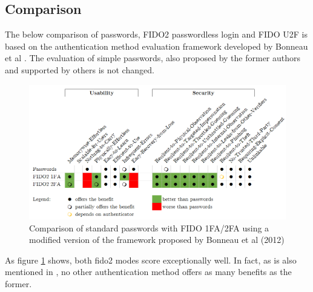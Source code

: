 \subsection{Comparison}
\label{subsec:comparison}

The below comparison of passwords, FIDO2 passwordless login and FIDO U2F is based on the authentication method evaluation framework developed by Bonneau et al \cite{bonneau2012}. The evaluation of simple passwords, also proposed by the former authors and supported by others \cite{lyastani2020} is not changed.

\begin{figure}[ht]
    \centering
    \includegraphics[width=1.8\columnwidth]{Figures/bonneau_matrix.png}
    \caption[Comparison of Authentication Methods]{Comparison of standard passwords with FIDO 1FA/2FA using a modified version of the framework proposed by Bonneau et al (2012)}
    \label{fig:bonneau_matrix}
\end{figure}

\noindent As figure \ref{fig:bonneau_matrix} shows, both \ac{fido2} modes score exceptionally well. In fact, as is also mentioned in \cite{lyastani2020}, no other authentication method offers as many benefits as the former.